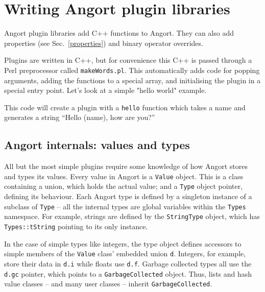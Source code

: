 \clearpage\section{Writing Angort plugin libraries}
Angort plugin libraries add C++ functions to Angort. They can also
add properties (see Sec.~\ref{properties}) and binary operator
overrides.

Plugins are written in C++, but for convenience this C++ is passed
through a Perl preprocessor called \texttt{makeWords.pl}. This automatically
adds code for popping arguments, adding the functions to a special
array, and initialising the plugin in a special entry point. Let's look
at a simple "hello world" example.



This code will create a plugin with a \texttt{hello} function which
takes a name and generates a string ``Hello (name), how are you?''

\subsection{Angort internals: values and types}
\label{typeinternals}
All but the most simple plugins require some knowledge of how
Angort stores and types its values. Every value in Angort is
a \texttt{Value} object. This is a class containing a union, which
holds the actual value; and a \texttt{Type} object pointer, defining
its behaviour. Each Angort type is defined by a singleton
instance of a subclass of \texttt{Type} -- all the internal types
are global variables within the \texttt{Types} namespace.
For example, strings are defined by the \texttt{StringType} object,
which has \texttt{Types::tString} pointing to its only instance.

In the case of simple types like integers, the type object defines
accessors to simple members of the \texttt{Value} class' embedded
union \texttt{d}. Integers, for example, store their data in
\texttt{d.i} while floats use \texttt{d.f}. Garbage collected types
all use the \texttt{d.gc} pointer, which points to a
\texttt{GarbageCollected} object. Thus, lists and hash value
classes -- and
many user classes -- inherit \texttt{GarbageCollected}.

